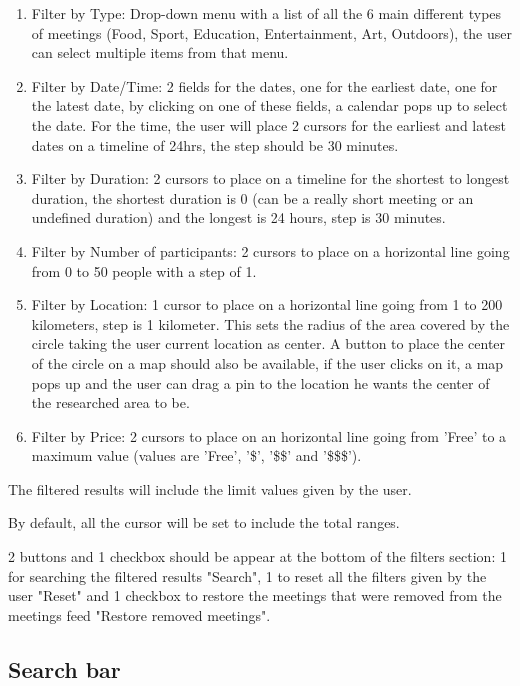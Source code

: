 \documentclass[conference]{IEEEtran}
\begin{document}
\begin{enumerate}
    \item Filter by Type: Drop-down menu with a list of all the 6 main different types of meetings (Food, Sport, Education, Entertainment, Art, Outdoors), the user can select multiple items from that menu.
    \item Filter by Date/Time: 2 fields for the dates, one for the earliest date, one for the latest date, by clicking on one of these fields, a calendar pops up to select the date. 
    For the time, the user will place 2 cursors for the earliest and latest dates on a timeline of 24hrs, the step should be 30 minutes.
    \item Filter by Duration: 2 cursors to place on a timeline for the shortest to longest duration, the shortest duration is 0 (can be a really short meeting or an undefined duration) and the longest is 24 hours, step is 30 minutes.
    \item Filter by Number of participants: 2 cursors to place on a horizontal line going from 0 to 50 people with a step of 1. 
    \item Filter by Location: 1 cursor to place on a horizontal line going from 1 to 200 kilometers, step is 1 kilometer. 
    This sets the radius of the area covered by the circle taking the user current location as center. 
    A button to place the center of the circle on a map should also be available, if the user clicks on it, a map pops up and the user can drag a pin to the location he wants the center of the researched area to be.
    \item Filter by Price: 2 cursors to place on an horizontal line going from 'Free' to a maximum value (values are 'Free', '\$', '\$\$' and '\$\$\$').
\end{enumerate}

The filtered results will include the limit values given by the user.

By default, all the cursor will be set to include the total ranges.

2 buttons and 1 checkbox should be appear at the bottom of the filters section: 1 for searching the filtered results "Search", 1 to reset all the filters given by the user "Reset" and 1 checkbox to restore the meetings that were removed from the meetings feed "Restore removed meetings".

\subsection{Search bar}
\end{document}
